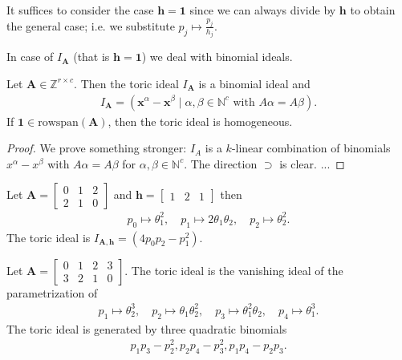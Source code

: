 It suffices to consider the case \( \mathbf h = \mathbf 1 \) since we can always divide by \( \mathbf h \) to obtain the general case; i.e. we substitute \( p_j \mapsto \frac{p_j}{h_j} \). 

In case of \( I_\mathbf A \) (that is \( \mathbf h = \mathbf 1 \)) we deal with binomial ideals.

\begin{mdframed}
\begin{prop}
  Let \( \mathbf A \in \mathbb Z^{r \times c} \). Then the toric ideal \( I_\mathbf A \) is a binomial ideal and 
  \begin{align*}
    I_\mathbf A = (\mathbf x^\alpha  - \mathbf x^\beta \mid \alpha, \beta \in \mathbb N^c \text{ with } A\alpha = A\beta).
  \end{align*}
  If \( \mathbf 1 \in \mathrm{rowspan}(\mathbf A) \), then the toric ideal is homogeneous.
\end{prop}
\end{mdframed}

\begin{proof}
  We prove something stronger: \( I_A \) is a \( k \)-linear combination of binomials \( x^\alpha - x^\beta \) with \( A\alpha = A \beta \) for \( \alpha, \beta \in \mathbb{N}^c \). The direction \( \supset \) is clear. ...
\end{proof}

\begin{eg}
  Let \(\mathbf  A = \begin{bmatrix}
    0 &1 & 2  \\ 2 & 1 & 0
  \end{bmatrix} \) and \( \mathbf h = \begin{bmatrix}
    1 & 2 & 1
  \end{bmatrix} \) then 
  \begin{align*}
    p_0 \mapsto \theta_1^2, \quad p_1 \mapsto 2\theta_1\theta_2, \quad p_2 \mapsto \theta_2^2.
  \end{align*} 
  The toric ideal is \( I_{\mathbf{A}, \mathbf{h}} = (4p_0p_2 - p_1^2) \).
\end{eg}

\begin{eg}
  Let \( \mathbf A = \begin{bmatrix}
    0 & 1 & 2 & 3 \\ 3 & 2 & 1 & 0
  \end{bmatrix} \). The toric ideal is the vanishing ideal of the parametrization of 
  \begin{align*}
    p_1 \mapsto \theta_2^3, \quad p_2 \mapsto \theta_1\theta_2^2,\quad p_3 \mapsto \theta_1^2\theta_2, \quad p_4 \mapsto \theta_1^3.
  \end{align*}
  The toric ideal is generated by three quadratic binomials 
  \begin{align*}
    p_1p_3 - p_2^2, p_2p_4 - p_3^2, p_1p_4 - p_2p_3.
  \end{align*}
\end{eg}

